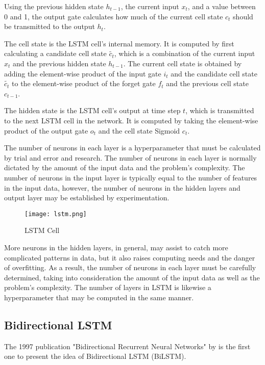 \documentclass[a4paper]{article}
\begin{document}
Using the previous hidden state $h_{t-1}$, the current input $x_t$, and a value between 0 and 1, the output gate calculates how much of the current cell state $c_t$ should be transmitted to the output $h_t$.

The cell state is the LSTM cell's internal memory. It is computed by first calculating a candidate cell state $\tilde{c_t}$, which is a combination of the current input $x_t$ and the previous hidden state $h_{t-1}$. The current cell state is obtained by adding the element-wise product of the input gate $i_t$ and the candidate cell state $\tilde{c_t}$ to the element-wise product of the forget gate $f_t$ and the previous cell state $c_{t-1}$.

The hidden state is the LSTM cell's output at time step $t$, which is transmitted to the next LSTM cell in the network. It is computed by taking the element-wise product of the output gate $o_t$ and the cell state Sigmoid $c_t$.

The number of neurons in each layer is a hyperparameter that must be calculated by trial and error and research. The number of neurons in each layer is normally dictated by the amount of the input data and the problem's complexity. The number of neurons in the input layer is typically equal to the number of features in the input data, however, the number of neurons in the hidden layers and output layer may be established by experimentation.

\begin{center}
\begin{figure}[!h]
    \centering
    \texttt{[image: lstm.png]}
    \caption{LSTM Cell}
    \label{fig:my_label}
\end{figure}
\end{center}

More neurons in the hidden layers, in general, may assist to catch more complicated patterns in data, but it also raises computing needs and the danger of overfitting. As a result, the number of neurons in each layer must be carefully determined, taking into consideration the amount of the input data as well as the problem's complexity. The number of layers in LSTM is likewise a hyperparameter that may be computed in the same manner.
\subsection{Bidirectional LSTM}

The 1997 publication "Bidirectional Recurrent Neural Networks" by \cite{schuster1997bidirectional} is the first one to present the idea of Bidirectional LSTM (BiLSTM).
\end{document}
